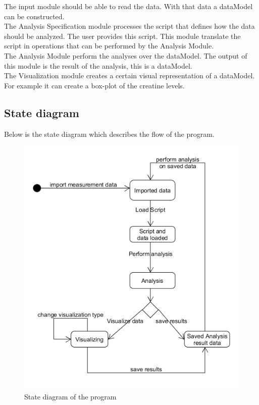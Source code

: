 \documentclass[a4paper]{article}
\begin{document}
The input module should be able to read the data. With that data a dataModel
can be constructed. \\
The Analysis Specification module processes the script that defines how the
data should be analyzed. The user provides this script. This module translate
the script in operations that can be performed by the Analysis Module.\\
The Analysis Module perform the analyses over the dataModel. The output of this
module is the result of the analysis, this is a dataModel.\\
The Visualization module creates a certain visual representation of a
dataModel. For example it can create a box-plot of the creatine levels.

\subsection{State diagram}
Below is the state diagram which describes the flow of the program.
\begin{figure}[h]
	\centering
	\includegraphics[scale=0.5]{images/statemachine.png}
	\caption{State diagram of the program}
	\label{fig:statemachine}
\end{figure}
\end{document}
